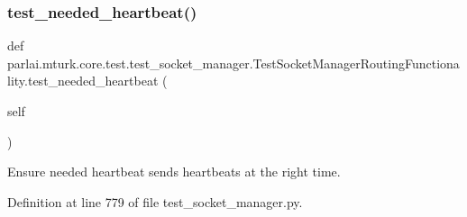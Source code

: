 \subsubsection{\texorpdfstring{test\+\_\+needed\+\_\+heartbeat()}{test\_needed\_heartbeat()}}
{\footnotesize\ttfamily def parlai.\+mturk.\+core.\+test.\+test\+\_\+socket\+\_\+manager.\+Test\+Socket\+Manager\+Routing\+Functionality.\+test\+\_\+needed\+\_\+heartbeat (\begin{DoxyParamCaption}\item[{}]{self }\end{DoxyParamCaption})}

\begin{DoxyVerb}Ensure needed heartbeat sends heartbeats at the right time.
\end{DoxyVerb}
 

Definition at line 779 of file test\+\_\+socket\+\_\+manager.\+py.


